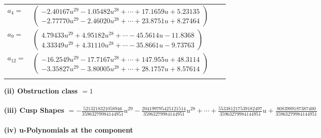 \documentclass[1p]{elsarticle_modified}
\theoremstyle{definition}
\begin{document}
\begin{tabular}{m{7pt} m{180pt} m{7pt} m{180pt} }
\flushright $a_{4}=$&$\begin{pmatrix}-2.40167 u^{29}-1.05482 u^{28}+\cdots+17.1659 u+5.23135\\-2.77770 u^{29}-2.46020 u^{28}+\cdots+23.8751 u+8.27464\end{pmatrix}$ \\
\flushright $a_{9}=$&$\begin{pmatrix}4.79433 u^{29}+4.95182 u^{28}+\cdots-45.5614 u-11.8368\\4.33349 u^{29}+4.31110 u^{28}+\cdots-35.8661 u-9.73763\end{pmatrix}$ \\
\flushright $a_{12}=$&$\begin{pmatrix}-16.2549 u^{29}-17.7167 u^{28}+\cdots+147.955 u+48.3114\\-3.35827 u^{29}-3.80005 u^{28}+\cdots+28.1757 u+8.57614\end{pmatrix}$\\&\end{tabular}
\flushleft \textbf{(ii) Obstruction class $= 1$}\\~\\
\flushleft \textbf{(iii) Cusp Shapes $= -\frac{5213218321058946}{35963279984144951} u^{29}-\frac{204199795425121514}{35963279984144951} u^{28}+\cdots+\frac{553381217539182497}{35963279984144951} u+\frac{8083989187387400}{35963279984144951}$}\\~\\
\newpage\renewcommand{\arraystretch}{1}
\flushleft \textbf{(iv) u-Polynomials at the component}\newline \\
\end{document}
